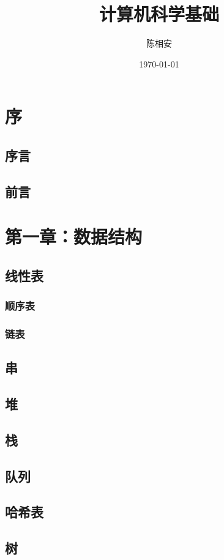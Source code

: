 \documentclass[UTF8]{book}
\title{计算机科学基础}
\author{陈相安}
\date{\today}
\begin{document}
    \maketitle
    \newpage
    \tableofcontents
    \newpage
    \chapter{序}
        \section{序言}
        \section{前言}
    \newpage
    \chapter{第一章：数据结构}
        \section{线性表}
            \subsection{顺序表}
            \subsection{链表}
        \section{串}
        \section{堆}
        \section{栈}
        \section{队列}
        \section{哈希表}
        \section{树}
\end{document}
